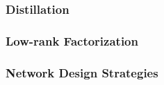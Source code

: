 \documentclass[../../D1.tex]{subfiles}
\begin{document}
\subsubsection{Distillation}\label{sec:Distillation}

\subsubsection{Low-rank Factorization}\label{sec:lrFactorization}

\subsubsection{Network Design Strategies}\label{sec:NetworkDesignStrat}
\end{document}
